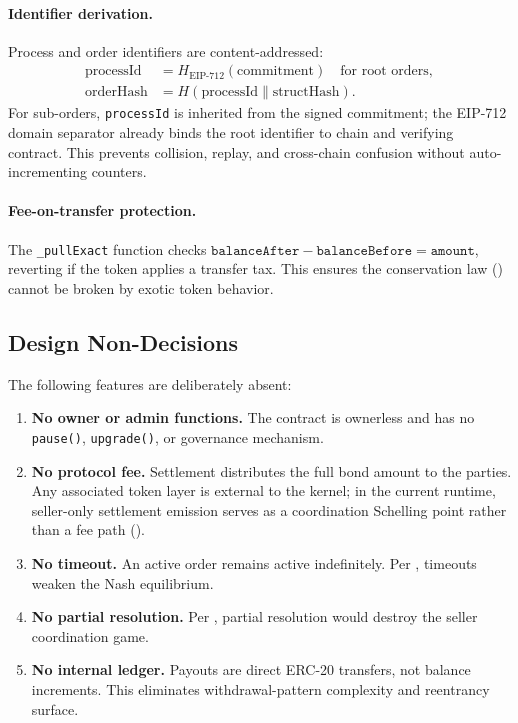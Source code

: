 \documentclass[11pt,a4paper]{article}
\theoremstyle{definition}
\theoremstyle{remark}
\begin{document}
\paragraph{Identifier derivation.}
Process and order identifiers are content-addressed:
\begin{align}
  \text{processId} &= H_{\text{EIP-712}}(\text{commitment}) \quad \text{for root orders}, \\
  \text{orderHash} &= H(\text{processId} \| \text{structHash}).
\end{align}
For sub-orders, \texttt{processId} is inherited from the signed
commitment; the EIP-712 domain separator already binds the root
identifier to chain and verifying contract. This prevents collision,
replay, and cross-chain confusion without auto-incrementing counters.

\paragraph{Fee-on-transfer protection.}
The \texttt{\_pullExact} function checks
$\texttt{balanceAfter} - \texttt{balanceBefore} = \texttt{amount}$,
reverting if the token applies a transfer tax. This ensures the
conservation law () cannot be broken by exotic
token behavior.

\subsection{Design Non-Decisions}

The following features are deliberately absent:

\begin{enumerate}
  \item \textbf{No owner or admin functions.} The contract is ownerless
    and has no \texttt{pause()}, \texttt{upgrade()}, or governance
    mechanism.
  \item \textbf{No protocol fee.} Settlement distributes the full bond
    amount to the parties. Any associated token layer is external to
    the kernel; in the current runtime, seller-only settlement
    emission serves as a coordination Schelling point rather than a
    fee path ().
  \item \textbf{No timeout.} An active order remains active indefinitely.
    Per , timeouts weaken the Nash
    equilibrium.
  \item \textbf{No partial resolution.} Per
    , partial resolution would destroy
    the seller coordination game.
  \item \textbf{No internal ledger.} Payouts are direct ERC-20 transfers,
    not balance increments. This eliminates withdrawal-pattern complexity
    and reentrancy surface.
\end{enumerate}
\end{document}
